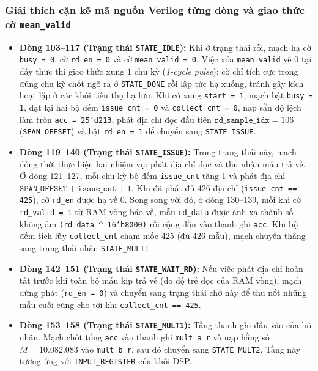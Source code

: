 \subsubsection*{Giải thích cặn kẽ mã nguồn Verilog từng dòng và giao thức cờ \texttt{mean\_valid}}
\begin{itemize}[leftmargin=1.5em, itemsep=3pt]
    \item \textbf{Dòng 103--117 (Trạng thái \texttt{STATE\_IDLE}):} Khi ở trạng thái rỗi, mạch hạ cờ \texttt{busy = 0}, cờ \texttt{rd\_en = 0} và cờ \texttt{mean\_valid = 0}. Việc xóa \texttt{mean\_valid} về $0$ tại đây thực thi giao thức xung $1\text{ chu kỳ}$ (\textit{1-cycle pulse}): cờ chỉ tích cực trong đúng chu kỳ chốt ngõ ra ở \texttt{STATE\_DONE} rồi lập tức hạ xuống, tránh gây kích hoạt lặp ở các khối tiêu thụ hạ lưu. Khi có xung \texttt{start = 1}, mạch bật \texttt{busy = 1}, đặt lại hai bộ đếm \texttt{issue\_cnt = 0} và \texttt{collect\_cnt = 0}, nạp sẵn độ lệch làm tròn \texttt{acc = 25'd213}, phát địa chỉ đọc đầu tiên $\texttt{rd\_sample\_idx} = 106$ (\texttt{SPAN\_OFFSET}) và bật \texttt{rd\_en = 1} để chuyển sang \texttt{STATE\_ISSUE}.
    \item \textbf{Dòng 119--140 (Trạng thái \texttt{STATE\_ISSUE}):} Trong trạng thái này, mạch đồng thời thực hiện hai nhiệm vụ: phát địa chỉ đọc và thu nhận mẫu trả về. Ở dòng 121--127, mỗi chu kỳ bộ đếm \texttt{issue\_cnt} tăng 1 và phát địa chỉ $\texttt{SPAN\_OFFSET} + \texttt{issue\_cnt} + 1$. Khi đã phát đủ 426 địa chỉ (\texttt{issue\_cnt == 425}), cờ \texttt{rd\_en} được hạ về 0. Song song với đó, ở dòng 130--139, mỗi khi cờ \texttt{rd\_valid = 1} từ RAM vòng báo về, mẫu \texttt{rd\_data} được ánh xạ thành số không âm \texttt{(rd\_data \^{} 16'h8000)} rồi cộng dồn vào thanh ghi \texttt{acc}. Khi bộ đếm tích lũy \texttt{collect\_cnt} chạm mốc 425 (đủ 426 mẫu), mạch chuyển thẳng sang trạng thái nhân \texttt{STATE\_MULT1}.
    \item \textbf{Dòng 142--151 (Trạng thái \texttt{STATE\_WAIT\_RD}):} Nếu việc phát địa chỉ hoàn tất trước khi toàn bộ mẫu kịp trả về (do độ trễ đọc của RAM vòng), mạch dừng phát (\texttt{rd\_en = 0}) và chuyển sang trạng thái chờ này để thu nốt những mẫu cuối cùng cho tới khi \texttt{collect\_cnt == 425}.
    \item \textbf{Dòng 153--158 (Trạng thái \texttt{STATE\_MULT1}):} Tầng thanh ghi đầu vào của bộ nhân. Mạch chốt tổng \texttt{acc} vào thanh ghi \texttt{mult\_a\_r} và nạp hằng số $M = 10.082.083$ vào \texttt{mult\_b\_r}, sau đó chuyển sang \texttt{STATE\_MULT2}. Tầng này tương ứng với \texttt{INPUT\_REGISTER} của khối DSP.

\end{itemize}
